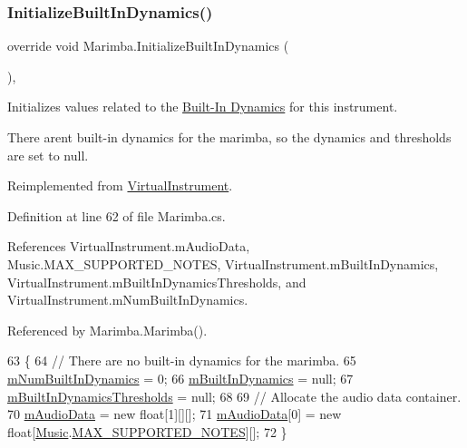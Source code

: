 \subsubsection{\texorpdfstring{Initialize\+Built\+In\+Dynamics()}{InitializeBuiltInDynamics()}}
{\footnotesize\ttfamily override void Marimba.\+Initialize\+Built\+In\+Dynamics (\begin{DoxyParamCaption}{ }\end{DoxyParamCaption})\hspace{0.3cm}{\ttfamily [protected]}, {\ttfamily [virtual]}}



Initializes values related to the \hyperlink{group___audio_DefBID}{Built-\/\+In Dynamics} for this instrument. 

There aren\textquotesingle{}t built-\/in dynamics for the marimba, so the dynamics and thresholds are set to null. 

Reimplemented from \hyperlink{group___v_i_base_virt_func_ga995456c03ee54543b285188c51c29a07}{Virtual\+Instrument}.



Definition at line 62 of file Marimba.\+cs.



References Virtual\+Instrument.\+m\+Audio\+Data, Music.\+M\+A\+X\+\_\+\+S\+U\+P\+P\+O\+R\+T\+E\+D\+\_\+\+N\+O\+T\+ES, Virtual\+Instrument.\+m\+Built\+In\+Dynamics, Virtual\+Instrument.\+m\+Built\+In\+Dynamics\+Thresholds, and Virtual\+Instrument.\+m\+Num\+Built\+In\+Dynamics.



Referenced by Marimba.\+Marimba().


\begin{DoxyCode}
63     \{
64         \textcolor{comment}{// There are no built-in dynamics for the marimba.}
65         \hyperlink{group___v_i_base_pro_var_gac265f64f759d267ee1e1680f8d387011}{mNumBuiltInDynamics} = 0;
66         \hyperlink{group___v_i_base_pro_var_ga87961e72f25fbc2256b614a394aa6f13}{mBuiltInDynamics} = null;
67         \hyperlink{group___v_i_base_pro_var_gae3db4264dc2a96e99ea680c6d637e6bf}{mBuiltInDynamicsThresholds} = null;
68 
69         \textcolor{comment}{// Allocate the audio data container.}
70         \hyperlink{group___v_i_base_pro_var_ga52e76d9b74408660584676035a92a2c6}{mAudioData} = \textcolor{keyword}{new} \textcolor{keywordtype}{float}[1][][];
71         \hyperlink{group___v_i_base_pro_var_ga52e76d9b74408660584676035a92a2c6}{mAudioData}[0] = \textcolor{keyword}{new} \textcolor{keywordtype}{float}[\hyperlink{class_music}{Music}.\hyperlink{group___music_constants_gaaf07da909a12e9fec0e43b70864f27b7}{MAX\_SUPPORTED\_NOTES}][];
72     \}
\end{DoxyCode}
